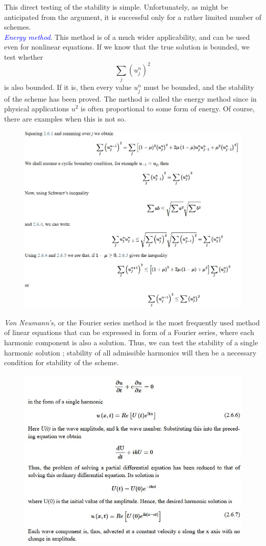 This direct testing of the stability is simple. Unfortunately, as might be anticipated from the argument, it is successful only for a rather limited number of schemes.\\



\textcolor{Blue}{\textit{Energy method}}. This method is of a much wider applicability, and can be used even for nonlinear equations. If we know that the true solution is bounded, we test whether
$$\displaystyle\sum_j(u_j^n)^2$$
is also bounded.
If it is, then every value \(u_j^n\) must be bounded, and the stability of the scheme has been proved. The method is called the energy method since in physical applications \(u^2\) is often proportional to some form of energy. Of course, there are examples when this is not so.
\begin{figure}[htpb]
	\centering
	\includegraphics[width=0.75\linewidth]{uploads/Immagine 2024-12-07 101350.jpg}
\end{figure}
\textit{ Von Neumann’s,} or the Fourier series method is the most frequently used method of linear equations that can be expressed in form of a Fourier series, where each harmonic component is also a solution. Thus, we can test the stability of a single harmonic solution ; stability of all admissible harmonics will then be a necessary condition for stability of the scheme.
\begin{figure}[htpb]
	\centering
	\includegraphics[width=0.70\linewidth]{uploads/Immagine 2024-12-07 102403.jpg}
\end{figure}
